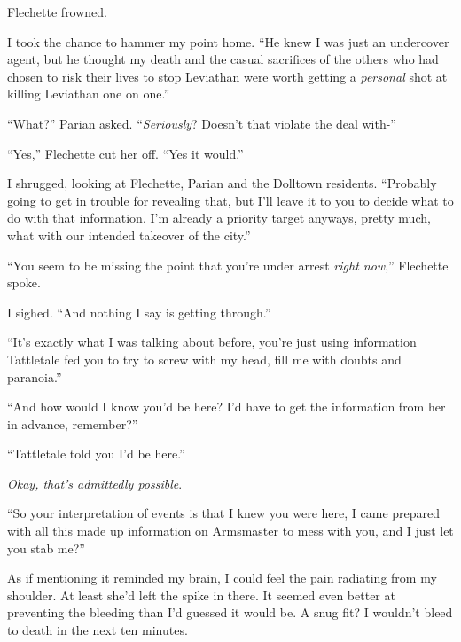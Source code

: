 Flechette frowned.



I took the chance to hammer my point home.  ``He knew I was just an undercover agent, but he thought my death and the casual sacrifices of the others who had chosen to risk their lives to stop Leviathan were worth getting a \emph{personal} shot at killing Leviathan one on one.''



``What?'' Parian asked.  ``\emph{Seriously}?  Doesn't that violate the deal with-''



``Yes,'' Flechette cut her off.  ``Yes it would.''



I shrugged, looking at Flechette, Parian and the Dolltown residents.  ``Probably going to get in trouble for revealing that, but I'll leave it to you to decide what to do with that information.  I'm already a priority target anyways, pretty much, what with our intended takeover of the city.''



``You seem to be missing the point that you're under arrest \emph{right now},'' Flechette spoke.



I sighed.  ``And nothing I say is getting through.''



``It's exactly what I was talking about before, you're just using information Tattletale fed you to try to screw with my head, fill me with doubts and paranoia.''



``And how would I know you'd be here?  I'd have to get the information from her in advance, remember?''



``Tattletale told you I'd be here.''



\emph{Okay, that's admittedly possible}.



``So your interpretation of events is that I knew you were here, I came prepared with all this made up information on Armsmaster to mess with you, and I just let you stab me?''



As if mentioning it reminded my brain, I could feel the pain radiating from my shoulder.  At least she'd left the spike in there.  It seemed even better at preventing the bleeding than I'd guessed it would be.  A snug fit?  I wouldn't bleed to death in the next ten minutes.




